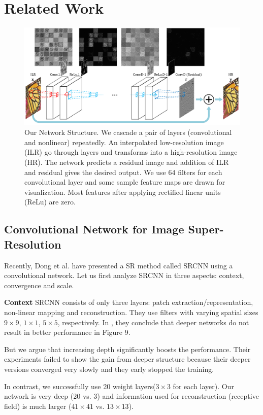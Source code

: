 \documentclass[10pt,twocolumn,letterpaper]{article}
\begin{document}
\section{Related Work}
\begin{figure}[t]
\includegraphics[width=\textwidth]{figs/fig2_sffsr.pdf}
\caption{Our Network Structure. We cascade a pair of layers (convolutional and nonlinear) repeatedly. An interpolated low-resolution image (ILR) go through layers and transforms into a high-resolution image (HR). The network predicts a residual image and addition of ILR and residual gives the desired output. We use 64 filters for each convolutional layer and some sample feature maps are drawn for visualization. Most features after applying rectified linear units (ReLu) are zero.}
\label{fig:network}
\end{figure}

\subsection{Convolutional Network for Image Super-Resolution}
Recently, Dong et al. \cite{dong2015image} have presented a SR method called SRCNN using a convolutional network. Let us first analyze SRCNN in three aspects: context, convergence and scale.

\textbf{Context}
SRCNN consists of only three layers: patch extraction/representation, non-linear mapping and reconstruction. They use filters with varying spatial sizes $9\times9$, $1\times1$, $5\times5$, respectively. In \cite{dong2015image}, they conclude that deeper networks do not result in better performance in Figure 9.

But we argue that increasing depth significantly boosts the performance. Their experiments failed to show the gain from deeper structure because their deeper versions converged very slowly and they early stopped the training.

In contrast, we successfully use 20 weight layers($3\times3$ for each layer). Our network is very deep (20 vs. 3\cite{dong2015image}) and information used for reconstruction (receptive field) is much larger ($41\times41$ vs. $13\times13$\cite{dong2015image}).
\end{document}
